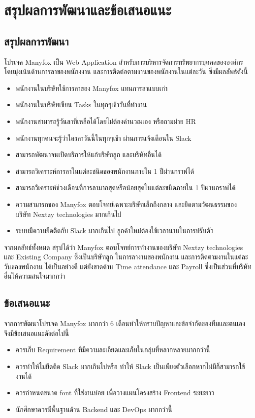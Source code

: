 \chapter{สรุปผลการพัฒนาและข้อเสนอแนะ}
\label{chapter:conclusion}
\section{สรุปผลการพัฒนา}
 โปรเจค Manyfox เป็น Web Application สำหรับการบริหารจัดการทรัพยากรบุคคลขององค์กร 
 โดยมุ่งเน้นด้านการลาของพนักงงาน และการติดต่อตามงานของพนักงานในแต่ละวัน ซึ่งมีผลลัพธ์ดังนี้
 \begin{itemize}
      \item พนักงานในบริษัทใช้การลาของ Manyfox แทนการลาแบบเก่า
      \item พนักงานในบริษัทเขียน Tasks ในทุกๆเช้าวันที่ทำงาน
      \item พนักงานสามารถรู้วันลาที่เหลือได้โดยไม่ต้องคำนวณเอง หรือถามผ่าย HR
      \item พนักงานทุกคนจะรู้ว่าใครลาวันนี้ในทุกๆเช้า ผ่านการแจ้งเตือนใน Slack
      \item สามารถพัฒนาจนเปิดบริการให้แก้บริษัทลูก และบริษัทอื่นได้
      \item สามารถวิเคราะห์การลาในแต่ละชนิดของพนักงานภายใน 1 ปีผ่านกราฟได้
      \item สามารถวิเคราะห์ช่วงเดือนที่การลามากสุดหรือน้อยสุดในแต่ละชนิดภายใน 1 ปีผ่านกราฟได้
      \item ความสามารถของ Manyfox ตอบโจทย์เฉพาะบริษัทเล็กถึงกลาง และยึดตามวัฒนธรรมของ บริษัท Nextzy technologies มากเกินไป
      \item ระบบมึความยึดติดกับ Slack มากเกินไป ลูกค้าใหม่ต้องใช้เวลานานในการปรับตัว
    \end{itemize}

จากผลลัทธ์ทั้งหมด สรุปได้ว่า Manyfox ตอบโจทย์การทำงานของบริษัท Nextzy technologies 
และ Existing Company ซึ่งเป็นบริษัทลูก ในการลางานของพนักงาน และการติดตามงานในแต่ละวันของพนักงาน
ได้เป็นอย่างดี แต่ยังขาดด้าน Time attendance และ Payroll ซึ่งเป็นส่วนที่บริษัทอื่นให้ความสนใจมากกว่า
\newpage
\section{ข้อเสนอแนะ}
จากการพัฒนาโปรเจค Manyfox มากกว่า 6 เดือนทำให้ทราบปัญหาและข้อจำกัดของทีมและตนเอง จึงมีข้อเสนอแนะดังต่อไปนี้
\begin{itemize}
      \item ควรเก็บ Requirement ที่มีความละเอียดและเก็บในกลุ่มที่หลากหลายมากกว่านี้
      \item ควรทำให้ไม่ยึดติด Slack มากเกินไปหรือ ทำให้ Slack เป็นเพียงตัวเลือกหากไม่มีก็สามารถใช้งานได้
      \item ควรกำหนดขนาด font ที่ใช่งานบ่อย เพื่อวางแผนโครงสร้าง Frontend ระยะยาว
      \item นักศึกษาควรมีพื้นฐานด้าน Backend และ DevOps มากกว่านี้
\end{itemize}